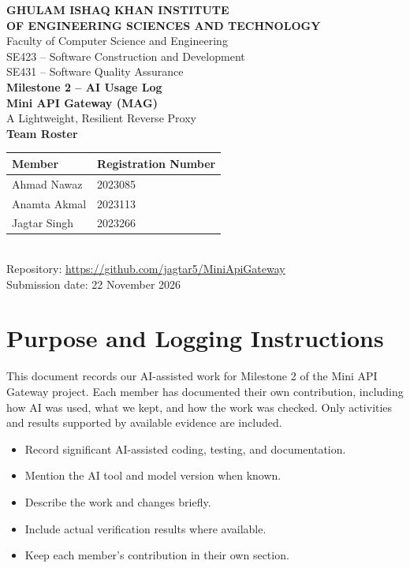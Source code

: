 \documentclass[11pt,a4paper]{article}
\newcommand{\ma}{Ahmad Nawaz}
\newcommand{\mb}{Anamta Akmal}
\newcommand{\mc}{Jagtar Singh}
\begin{document}
\begin{titlepage}
\centering

{\large\bfseries GHULAM ISHAQ KHAN INSTITUTE\\
OF ENGINEERING SCIENCES AND TECHNOLOGY}\\[0.3cm]

Faculty of Computer Science and Engineering\\[0.9cm]

SE423 -- Software Construction and Development\\
SE431 -- Software Quality Assurance\\[0.6cm]

{\LARGE\bfseries Milestone 2 -- AI Usage Log}\\[0.5cm]

{\Large\bfseries Mini API Gateway (MAG)}\\[0.2cm]
A Lightweight, Resilient Reverse Proxy\\[1cm]

{\bfseries Team Roster}\\[0.3cm]

\begin{tabular}{ll}
\toprule
\textbf{Member} & \textbf{Registration Number}\\
\midrule
\ma & 2023085\\
\mb & 2023113\\
\mc & 2023266\\
\bottomrule
\end{tabular}\\[0.8cm]

Repository: \url{https://github.com/jagtar5/MiniApiGateway}\\[0.4cm]
Submission date: 22 November 2026

\end{titlepage}

\section{Purpose and Logging Instructions}

This document records our AI-assisted work for Milestone 2 of
the Mini API Gateway project. Each member has documented their own
contribution, including how AI was used, what we kept, and how
the work was checked. Only activities and results supported by
available evidence are included.

\begin{itemize}[leftmargin=*]
\item Record significant AI-assisted coding, testing, and documentation.
\item Mention the AI tool and model version when known.
\item Describe the work and changes briefly.
\item Include actual verification results where available.
\item Keep each member's contribution in their own section.
\end{itemize}
\end{document}

